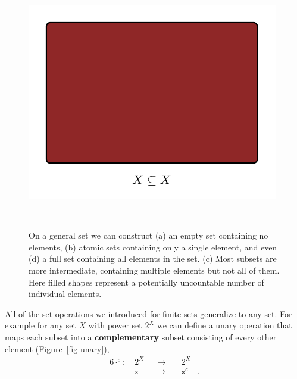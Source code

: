 \documentclass[
  letterpaper,
  DIV=11,
  numbers=noendperiod]{scrartcl}
\begin{document}
\begin{figure}
\begin{minipage}[t]{0.45\linewidth}
{{\includegraphics{figures/sets/examples/full/full.pdf}

}

}

\subcaption{\label{fig-full}}
\end{minipage}%
%
\begin{minipage}[t]{0.05\linewidth}

{\centering 

~

}

\end{minipage}%

\caption{\label{fig-subsets}On a general set we can construct (a) an
empty set containing no elements, (b) atomic sets containing only a
single element, and even (d) a full set containing all elements in the
set. (c) Most subsets are more intermediate, containing multiple
elements but not all of them. Here filled shapes represent a potentially
uncountable number of individual elements.}

\end{figure}

All of the set operations we introduced for finite sets generalize to
any set. For example for any set \(X\) with power set \(2^{X}\) we can
define a unary operation that maps each subset into a
\textbf{complementary} subset consisting of every other element
(Figure~\ref{fig-unary}), \begin{alignat*}{6}
\cdot^c :\; & 2^X & &\rightarrow& \; & 2^X &
\\
& \mathsf{x} & &\mapsto& & \mathsf{x}^{c} &.
\end{alignat*}
\end{document}
